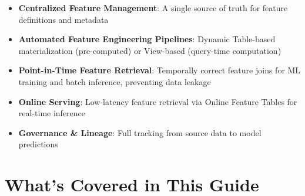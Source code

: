 \documentclass[
  letterpaper,
  DIV=11,
  numbers=noendperiod]{scrreprt}
\providecommand{\tightlist}{%
  \setlength{\itemsep}{0pt}\setlength{\parskip}{0pt}}\usepackage{longtable,booktabs,array}
\begin{document}
\begin{itemize}
\tightlist
\item
  \textbf{Centralized Feature Management}: A single source of truth for
  feature definitions and metadata
\item
  \textbf{Automated Feature Engineering Pipelines}: Dynamic Table-based
  materialization (pre-computed) or View-based (query-time computation)
\item
  \textbf{Point-in-Time Feature Retrieval}: Temporally correct feature
  joins for ML training and batch inference, preventing data leakage
\item
  \textbf{Online Serving}: Low-latency feature retrieval via Online
  Feature Tables for real-time inference
\item
  \textbf{Governance \& Lineage}: Full tracking from source data to
  model predictions
\end{itemize}

\hypertarget{whats-covered-in-this-guide}{%
\section{What's Covered in This
Guide}\label{whats-covered-in-this-guide}}
\end{document}

